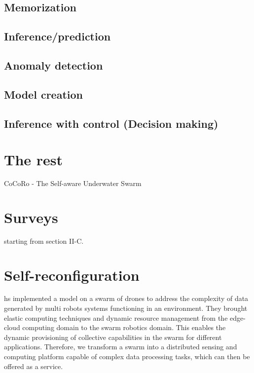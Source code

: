 \documentclass{article}
\begin{document}
	\subsection{Memorization}
	\subsection{Inference/prediction}
	\subsection{Anomaly detection}
	\subsection{Model creation}
	\subsection{Inference with control (Decision making)}
		 	
		
	\section{The rest}
	\cite{kernbach-2011-awareness-and-self-awareness-for-multi-robot-organisms}
	 
	CoCoRo - The Self-aware Underwater Swarm \cite{schmickl-2011-cocoro-the-self-aware-underwater-swarm}
	\section{Surveys}
	\cite{lewis-2011-a-survey-of-self-awareness-and-its-application-in-computing-systems} starting from section II-C.
	
	\section{Self-reconfiguration}
	\cite{pena-2019-blockchain-powered-collaboration-in-heterogeneous-swarms-of-robots} hs implemented a model on a swarm of drones to address the complexity of data generated by multi robots systems functioning in an environment. They  brought elastic computing techniques and dynamic resource management from the edge-cloud computing domain to the swarm robotics domain. This enables the dynamic provisioning of collective capabilities in the swarm for different applications. Therefore, we transform a swarm into a distributed sensing and computing platform capable of complex data processing tasks, which can then be offered as a service.
	
	
\end{document}
